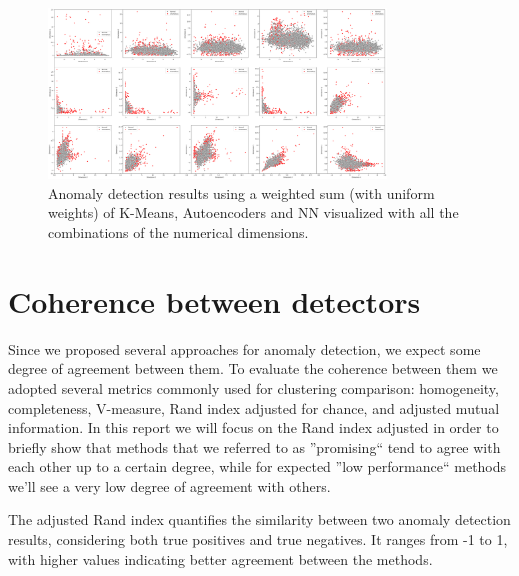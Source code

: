 \documentclass[9pt,twocolumn]{article}
\begin{document}
\begin{figure}[h]
    \centering
    \includegraphics[width=0.80\textwidth]{images/WS_floatdims.png}
    \caption{Anomaly detection results using a weighted sum (with uniform weights) of K-Means, Autoencoders and NN visualized with all the combinations of the numerical dimensions.}
    \label{fig:autoencoders_alldims}
\end{figure}

\section{Coherence between detectors}
Since we proposed several approaches for anomaly detection, we expect some degree of agreement between them. To evaluate the coherence between them we adopted several metrics commonly used for clustering comparison: homogeneity, completeness, V-measure, Rand index adjusted for chance, and adjusted mutual information.
In this report we will focus on the Rand index adjusted in order to briefly show that methods that we referred to as ''promising`` tend to agree with each other up to a certain degree, while for expected ''low performance`` methods we'll see a very low degree of agreement with others.

The adjusted Rand index quantifies the similarity between two anomaly detection results, considering both true positives and true negatives. It ranges from -1 to 1, with higher values indicating better agreement between the methods.
\end{document}
